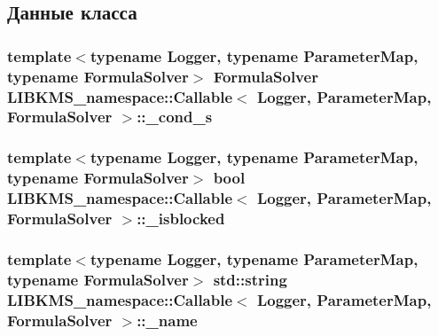 \subsection{Данные класса}
\hypertarget{classLIBKMS__namespace_1_1Callable_a0a2d1ea087e901a7cce848ff0efba7ca}{
\subsubsection[{\-\_\-cond\-\_\-s}]{\setlength{\rightskip}{0pt plus 5cm}template$<$typename Logger, typename Parameter\-Map, typename Formula\-Solver$>$ Formula\-Solver {\bf L\-I\-B\-K\-M\-S\-\_\-namespace\-::\-Callable}$<$ Logger, Parameter\-Map, Formula\-Solver $>$\-::\-\_\-cond\-\_\-s\hspace{0.3cm}{\ttfamily [protected]}}}\label{classLIBKMS__namespace_1_1Callable_a0a2d1ea087e901a7cce848ff0efba7ca}
\hypertarget{classLIBKMS__namespace_1_1Callable_a32c7bfc356667f15d5b40fc2ce41e2f7}{
\subsubsection[{\-\_\-isblocked}]{\setlength{\rightskip}{0pt plus 5cm}template$<$typename Logger, typename Parameter\-Map, typename Formula\-Solver$>$ bool {\bf L\-I\-B\-K\-M\-S\-\_\-namespace\-::\-Callable}$<$ Logger, Parameter\-Map, Formula\-Solver $>$\-::\-\_\-isblocked\hspace{0.3cm}{\ttfamily [protected]}}}\label{classLIBKMS__namespace_1_1Callable_a32c7bfc356667f15d5b40fc2ce41e2f7}
\hypertarget{classLIBKMS__namespace_1_1Callable_a86675c2e858a76fff1431b34d913d6a5}{
\subsubsection[{\-\_\-name}]{\setlength{\rightskip}{0pt plus 5cm}template$<$typename Logger, typename Parameter\-Map, typename Formula\-Solver$>$ std\-::string {\bf L\-I\-B\-K\-M\-S\-\_\-namespace\-::\-Callable}$<$ Logger, Parameter\-Map, Formula\-Solver $>$\-::\-\_\-name\hspace{0.3cm}{\ttfamily [protected]}}}\label{classLIBKMS__namespace_1_1Callable_a86675c2e858a76fff1431b34d913d6a5}
